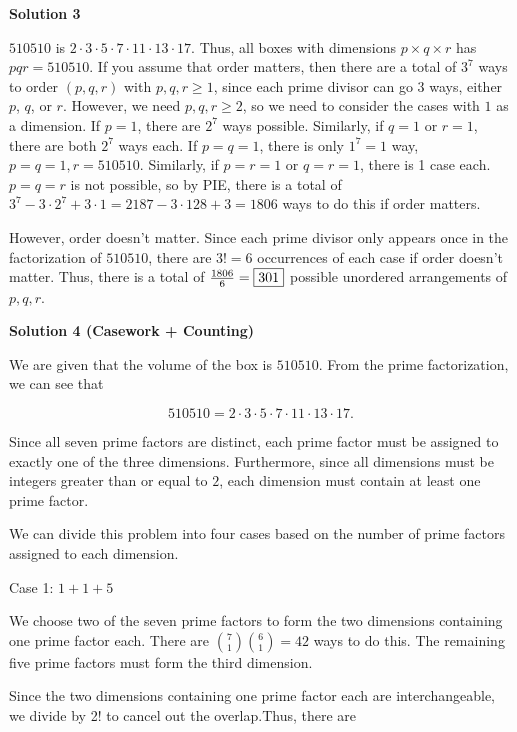 \begin{enumerate}
 



\textbf{Solution 3}

$510510$ is $2\cdot 3\cdot 5\cdot 7\cdot 11\cdot 13\cdot 17$. Thus, all boxes with dimensions $p\times q\times r$ has $pqr=510510$. If you assume that order matters, then there are a total of $3^7$ ways to order $(p,q,r)$ with $p,q,r\ge 1$, since each prime divisor can go $3$ ways, either $p$, $q$, or $r$. However, we need $p,q,r\ge 2$, so we need to consider the cases with $1$ as a dimension. If $p=1$, there are $2^7$ ways possible. Similarly, if $q=1$ or $r=1$, there are both $2^7$ ways each. If $p=q=1$, there is only $1^7=1$ way, $p=q=1, r=510510$. Similarly, if $p=r=1$ or $q=r=1$, there is 1 case each. $p=q=r$ is not possible, so by PIE, there is a total of $3^7-3\cdot 2^7+3\cdot 1=2187-3\cdot 128+3=1806$ ways to do this if order matters.

 However, order doesn’t matter. Since each prime divisor only appears once in the factorization of $510510$, there are $3!=6$ occurrences of each case if order doesn’t matter. Thus, there is a total of $\frac{1806}{6}=\fbox{301}$ possible unordered arrangements of $p,q,r$.

 



\textbf{Solution 4 (Casework + Counting)}

We are given that the volume of the box is $510510$. From the prime factorization, we can see that

 
 \[510510=2\cdot3\cdot5\cdot7\cdot11\cdot13\cdot17.\]

 Since all seven prime factors are distinct, each prime factor must be assigned to exactly one of the three dimensions. Furthermore, since all dimensions must be integers greater than or equal to $2$, each dimension must contain at least one prime factor.

 We can divide this problem into four cases based on the number of prime factors assigned to each dimension.

 
Case 1: $1+1+5$

 We choose two of the seven prime factors to form the two dimensions containing one prime factor each. There are $\binom{7}{1}\binom{6}{1} =42$ ways to do this. The remaining five prime factors must form the third dimension.

 Since the two dimensions containing one prime factor each are interchangeable, we divide by 2! to cancel out the overlap.Thus, there are


\end{enumerate}

